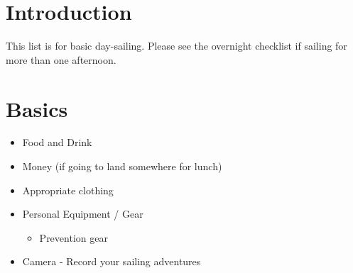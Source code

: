 \documentclass[fleqn,10pt]{navy} %
\affiliation{\textit{Updated by MIDN 2/C Ginelli}} %
\newlength{\tocsep}
\begin{document}

\flushbottom %

\maketitle %

\tableofcontents %

\thispagestyle{empty} %


\section*{Introduction} %

This list is for basic day-sailing.  Please see the overnight checklist if sailing for more than one afternoon.


\section{Basics}
\begin{itemize}[noitemsep]
    \item Food and Drink
    \item Money (if going to land somewhere for lunch)
    \item Appropriate clothing
    \item Personal Equipment / Gear
        \begin{itemize}
            \item Prevention gear
        \end{itemize}
    \item Camera - Record your sailing adventures
\end{itemize}
\end{document}
